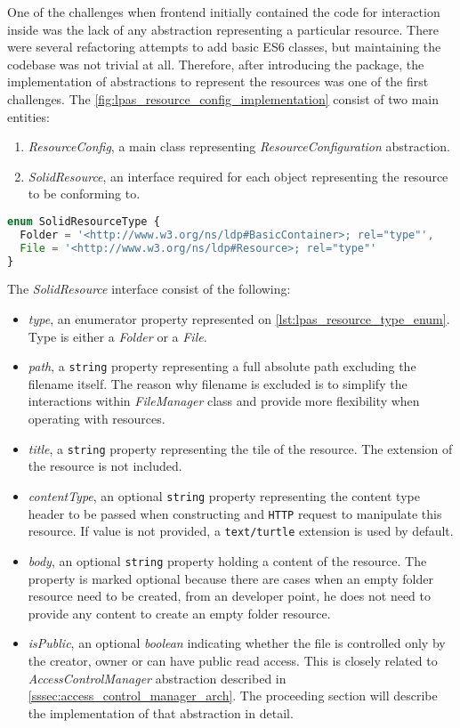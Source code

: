 One of the challenges when \lpa{} frontend initially contained the code for \solid{} interaction inside was the lack of any abstraction representing a particular \solid{} resource. There were several refactoring attempts to add basic ES6 classes, but maintaining the codebase was not trivial at all. Therefore, after introducing the \lpas{} package, the implementation of abstractions to represent the \solid{} resources was one of the first challenges. The \autoref{fig:lpas_resource_config_implementation} consist of two main entities:
\begin{enumerate}
    \item \textit{ResourceConfig}, a main class representing \textit{ResourceConfiguration} abstraction. 
    \item \textit{SolidResource}, an interface required for each object representing the \solid{} resource to be conforming to. 
\end{enumerate}

\begin{lstlisting}[label={lst:lpas_resource_type_enum},language=javascript]
enum SolidResourceType {
  Folder = '<http://www.w3.org/ns/ldp#BasicContainer>; rel="type"',
  File = '<http://www.w3.org/ns/ldp#Resource>; rel="type"'
}
\end{lstlisting}

The \textit{SolidResource} interface consist of the following:
\begin{itemize}
    \item \textit{type}, an enumerator property represented on \autoref{lst:lpas_resource_type_enum}. Type is either a \textit{Folder} or a \textit{File}.
    \item \textit{path}, a \texttt{string} property representing a full absolute path excluding the filename itself. The reason why filename is excluded is to simplify the interactions within \textit{FileManager} class and provide more flexibility when operating with resources.
    \item \textit{title}, a \texttt{string} property representing the tile of the resource. The extension of the resource is not included.
    \item \textit{contentType}, an optional \texttt{string} property representing the content type header to be passed when constructing and \texttt{HTTP} request to  manipulate this resource. If value is not provided, a \texttt{text/turtle} extension is used by default.
    \item \textit{body}, an optional \texttt{string} property holding a content of the resource. The property is marked optional because there are cases when an empty folder resource need to be created, from an \lpa{} developer point, he does not need to provide any content to create an empty folder resource.
    \item \textit{isPublic}, an optional \textit{boolean} indicating whether the file is controlled only by the creator, owner or can have public read access. This is closely related to \textit{AccessControlManager} abstraction described in \autoref{sssec:access_control_manager_arch}. The proceeding section will describe the implementation of that abstraction in detail.  
\end{itemize}

